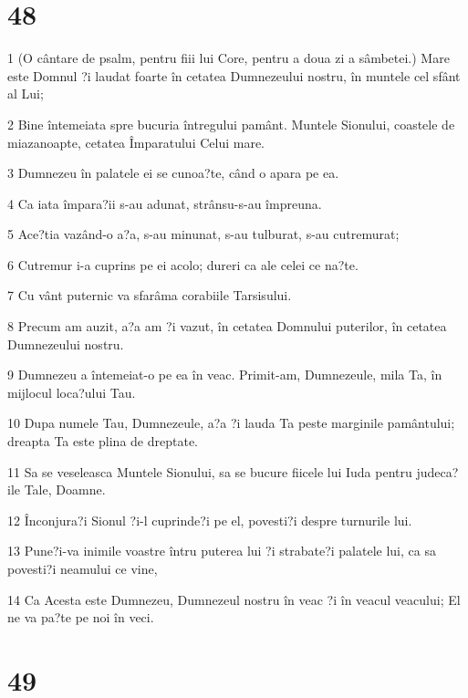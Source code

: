 \chapter{48}

\par 1 (O cântare de psalm, pentru fiii lui Core, pentru a doua zi a sâmbetei.) Mare este Domnul ?i laudat foarte în cetatea Dumnezeului nostru, în muntele cel sfânt al Lui;
\par 2 Bine întemeiata spre bucuria întregului pamânt. Muntele Sionului, coastele de miazanoapte, cetatea Împaratului Celui mare.
\par 3 Dumnezeu în palatele ei se cunoa?te, când o apara pe ea.
\par 4 Ca iata împara?ii s-au adunat, strânsu-s-au împreuna.
\par 5 Ace?tia vazând-o a?a, s-au minunat, s-au tulburat, s-au cutremurat;
\par 6 Cutremur i-a cuprins pe ei acolo; dureri ca ale celei ce na?te.
\par 7 Cu vânt puternic va sfarâma corabiile Tarsisului.
\par 8 Precum am auzit, a?a am ?i vazut, în cetatea Domnului puterilor, în cetatea Dumnezeului nostru.
\par 9 Dumnezeu a întemeiat-o pe ea în veac. Primit-am, Dumnezeule, mila Ta, în mijlocul loca?ului Tau.
\par 10 Dupa numele Tau, Dumnezeule, a?a ?i lauda Ta peste marginile pamântului; dreapta Ta este plina de dreptate.
\par 11 Sa se veseleasca Muntele Sionului, sa se bucure fiicele lui Iuda pentru judeca?ile Tale, Doamne.
\par 12 Înconjura?i Sionul ?i-l cuprinde?i pe el, povesti?i despre turnurile lui.
\par 13 Pune?i-va inimile voastre întru puterea lui ?i strabate?i palatele lui, ca sa povesti?i neamului ce vine,
\par 14 Ca Acesta este Dumnezeu, Dumnezeul nostru în veac ?i în veacul veacului; El ne va pa?te pe noi în veci.

\chapter{49}


